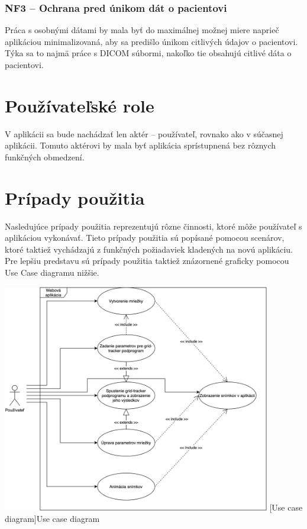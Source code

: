 \subsubsection {NF3 -- Ochrana pred únikom dát o pacientovi}
Práca s osobnými dátami by mala byť do maximálnej možnej miere naprieč aplikáciou minimalizovaná, aby sa predišlo únikom citlivých údajov o pacientovi. Týka sa to najmä práce s DICOM súbormi, nakoľko tie obsahujú citlivé dáta o pacientovi.

\section {Používateľské role}
V aplikácii sa bude nachádzať len aktér -- používateľ, rovnako ako v súčasnej aplikácii. Tomuto aktérovi by mala byť aplikácia sprístupnená bez rôznych funkčných obmedzení.

\section {Prípady použitia}
Nasledujúce prípady použitia reprezentujú rôzne činnosti, ktoré môže používateľ s aplikáciou vykonávať. Tieto prípady použitia sú popísané pomocou scenárov, ktoré taktiež vychádzajú z funkčných požiadaviek kladených na novú aplikáciu. Pre lepšiu predstavu sú prípady použitia taktiež znázornené graficky pomocou Use Case diagramu nižšie.

\begin {center}
        \centering
        \includegraphics[height=10cm]{media/graphs/usecase.png}
        \captionsetup{justification=centering}
        [Use case diagram]{Use case diagram}
\end {center}

